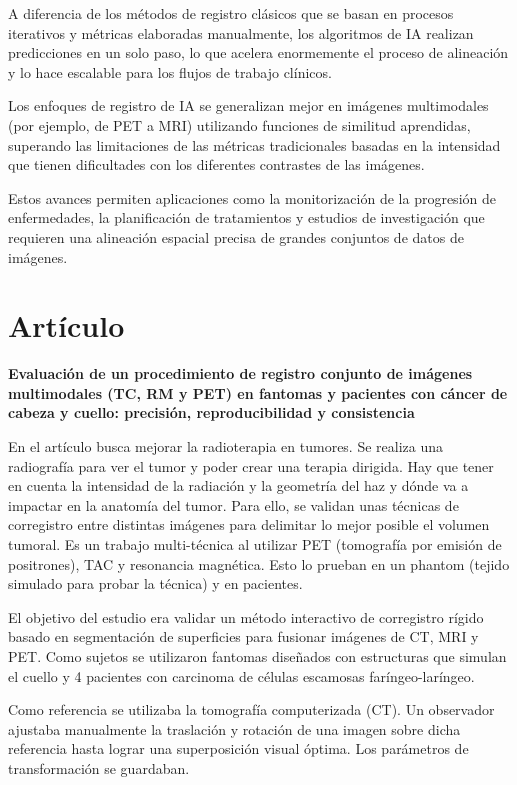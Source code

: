 A diferencia de los métodos de registro clásicos que se basan en procesos iterativos y métricas elaboradas manualmente, los algoritmos de IA realizan predicciones en un solo paso, lo que acelera enormemente el proceso de alineación y lo hace escalable para los flujos de trabajo clínicos.

Los enfoques de registro de IA se generalizan mejor en imágenes multimodales (por ejemplo, de PET a MRI) utilizando funciones de similitud aprendidas, superando las limitaciones de las métricas tradicionales basadas en la intensidad que tienen dificultades con los diferentes contrastes de las imágenes.

Estos avances permiten aplicaciones como la monitorización de la progresión de enfermedades, la planificación de tratamientos y estudios de investigación que requieren una alineación espacial precisa de grandes conjuntos de datos de imágenes.

\section{Artículo}
\textbf{Evaluación de un procedimiento de registro conjunto de imágenes multimodales (TC, RM y PET) en fantomas y pacientes con cáncer de cabeza y cuello: precisión, reproducibilidad y consistencia}

En el artículo busca mejorar la radioterapia en tumores. Se realiza una radiografía para ver el tumor y poder crear una terapia dirigida. Hay que tener en cuenta la intensidad de la radiación y la geometría del haz y dónde va a impactar en la anatomía del tumor. Para ello, se validan unas técnicas de corregistro entre distintas imágenes para delimitar lo mejor posible el volumen tumoral. Es un trabajo multi-técnica al utilizar PET (tomografía por emisión de positrones), TAC y resonancia magnética. Esto lo prueban en un phantom (tejido simulado para probar la técnica) y en pacientes. 

El objetivo del estudio era validar un método interactivo de corregistro rígido basado en segmentación de superficies para fusionar imágenes de CT, MRI y PET. Como sujetos se utilizaron fantomas diseñados con estructuras que simulan el cuello y 4 pacientes con carcinoma de células escamosas faríngeo-laríngeo.

Como referencia se utilizaba la tomografía computerizada (CT). Un observador ajustaba manualmente la traslación y rotación de una imagen sobre dicha referencia hasta lograr una superposición visual óptima. Los parámetros de transformación se guardaban.

